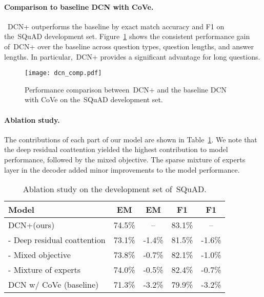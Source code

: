 \documentclass{article} \usepackage{iclr2018_conference,times}
\newcommand{\modelname}{DCN+\xspace}
\newcommand{\squad}{SQuAD\xspace}
\newcommand{\devemours}{74.5\%\xspace}
\newcommand{\devfours}{83.1\%\xspace}
\newcommand{\emcove}{71.3\%\xspace}
\newcommand{\fcove}{79.9\%\xspace}
\newcommand{\deltaemcove}{3.2\%\xspace}
\newcommand{\deltafcove}{3.2\%\xspace}
\newcommand{\emnocoattention}{73.1\%\xspace}
\newcommand{\fnocoattention}{81.5\%\xspace}
\newcommand{\deltaemcoattention}{1.4\%\xspace}
\newcommand{\deltafcoattention}{1.6\%\xspace}
\newcommand{\emnomixedobjective}{73.8\%\xspace}
\newcommand{\fnomixedobjective}{82.1\%\xspace}
\newcommand{\deltaemmixedobjective}{0.7\%\xspace}
\newcommand{\deltafmixedobjective}{1.0\%\xspace}
\newcommand{\emnomoe}{74.0\%\xspace}
\newcommand{\fnomoe}{82.4\%\xspace}
\newcommand{\deltaemmoe}{0.5\%\xspace}
\newcommand{\deltafmoe}{0.7\%\xspace}
\begin{document}
\paragraph{Comparison to baseline DCN with CoVe.}
~\modelname outperforms the baseline by  exact match accuracy and  F1 on the~\squad development set.
Figure~\ref{fig:dcn_comp} shows the consistent performance gain of~\modelname over the baseline across question types, question lengths, and answer lengths.
In particular,~\modelname provides a significant advantage for long questions.

\begin{figure}[!htb]
\texttt{[image: dcn\_comp.pdf]}
\caption{
  Performance comparison between~\modelname and the baseline DCN with CoVe on the~\squad development set.
}\label{fig:dcn_comp}
\vspace{-2mm}
\end{figure}



\paragraph{Ablation study.}
The contributions of each part of our model are shown in Table~\ref{table:ablation}.
We note that the deep residual coattention yielded the highest contribution to model performance, followed by the mixed objective.
The sparse mixture of experts layer in the decoder added minor improvements to the model performance.

\begin{table}[ht!]
\vspace{-3mm}
\centering
\begin{tabular}{lcccc}
\toprule
Model                & EM & EM & F1 & F1 \\
\midrule
\modelname (ours) & \devemours & -- & \devfours & -- \\
- Deep residual coattention  & \emnocoattention & -\deltaemcoattention & \fnocoattention & -\deltafcoattention \\
- Mixed objective  & \emnomixedobjective & -\deltaemmixedobjective & \fnomixedobjective & -\deltafmixedobjective \\
- Mixture of experts  & \emnomoe & -\deltaemmoe & \fnomoe  & -\deltafmoe \\
DCN w/ CoVe (baseline) & \emcove & -\deltaemcove & \fcove & -\deltafcove \\
\bottomrule
\end{tabular}
\vspace{-2mm}
\caption{
Ablation study on the development set of~\squad.
}
\label{table:ablation}
\end{table}
\end{document}
